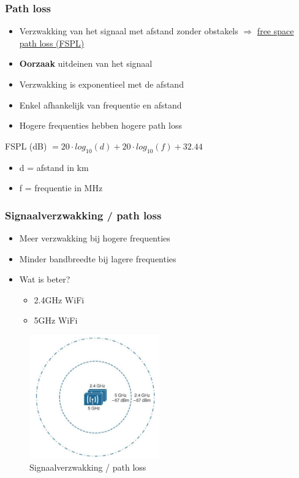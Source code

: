 \documentclass{article}
\newcommand{\bold}[1]{\textbf{#1}}
\begin{document}
\subsubsection{Path loss}
\begin{itemize}
    \item Verzwakking van het signaal met afstand zonder obstakels $\Rightarrow$ \underline{free space path loss (FSPL)}
    \item \bold{Oorzaak} uitdeinen van het signaal
    \item Verzwakking is exponentieel met de afstand
    \item Enkel afhankelijk van frequentie en afstand
    \item Hogere frequenties hebben hogere path loss
\end{itemize}

FSPL (dB) $= 20\cdot log_{10}(d) + 20\cdot log_{10}(f) + 32.44$
\begin{itemize}
    \item d = afstand in km
    \item f = frequentie in MHz
\end{itemize}

\subsubsection{Signaalverzwakking / path loss}
\begin{itemize}
    \item Meer verzwakking bij hogere frequenties
    \item Minder bandbreedte bij lagere frequenties
    \item Wat is beter?
    \begin{itemize}
        \item 2.4GHz WiFi
        \item 5GHz WiFi
    \end{itemize}
\end{itemize}

\begin{figure}[H]
    \centering
    \includegraphics[width=0.5\textwidth]{Screenshot_20200309_123426.png}
    \caption{Signaalverzwakking / path loss}
\end{figure}
\end{document}
